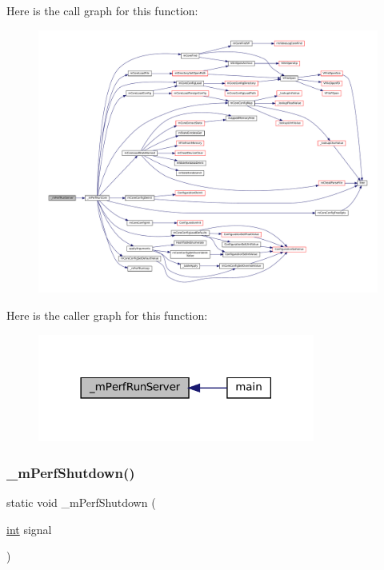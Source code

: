 Here is the call graph for this function\+:
\nopagebreak
\begin{figure}[H]
\begin{center}
\leavevmode
\includegraphics[width=350pt]{perf-main_8c_afabe448ade5b82039d7a47c954faff33_cgraph}
\end{center}
\end{figure}
Here is the caller graph for this function\+:
\nopagebreak
\begin{figure}[H]
\begin{center}
\leavevmode
\includegraphics[width=258pt]{perf-main_8c_afabe448ade5b82039d7a47c954faff33_icgraph}
\end{center}
\end{figure}
\mbox{\label{perf-main_8c_ae03bb46043d38ba7457625ec193d25c9}} 
\subsubsection{\texorpdfstring{\+\_\+m\+Perf\+Shutdown()}{\_mPerfShutdown()}}
{\footnotesize\ttfamily static void \+\_\+m\+Perf\+Shutdown (\begin{DoxyParamCaption}\item[{\mbox{\hyperlink{ioapi_8h_a787fa3cf048117ba7123753c1e74fcd6}{int}}}]{signal }\end{DoxyParamCaption})\hspace{0.3cm}{\ttfamily [static]}}

